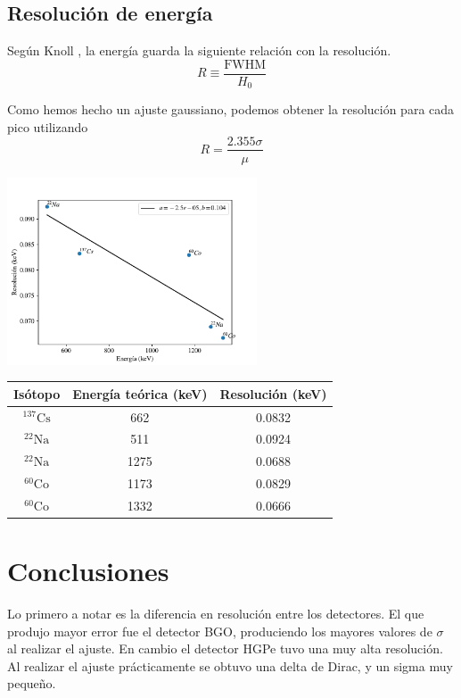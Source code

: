 \documentclass[a4paper, onecolumn]{article}
\begin{document}
		\subsection{Resolución de energía}

		Según Knoll \cite{knoll_radiation_2010}, la energía guarda la siguiente relación con la resolución.
		$$
		R \equiv \frac{\mathrm{FWHM}}{H_0}
		$$

		Como hemos hecho un ajuste gaussiano, podemos obtener la resolución para cada pico utilizando
		$$
		R = \frac{2.355\sigma}{\mu}
		$$

		\begin{center}
			\includegraphics[width=210pt]{img/resolution_vs_energy.pdf}
		\end{center}

		\begin{center}
			{\renewcommand{\arraystretch}{1.5}
			\renewcommand{\tabcolsep}{0.2cm}
			\label{table_energy_resolution}
			\begin{tabular}{ c c c  }
				\hline
				Isótopo & Energía teórica (keV) & Resolución (keV) \\
				\hline
				${}^{137}\mathrm{Cs}$ & 662 & 0.0832\\ 
				${}^{22}\mathrm{Na}$  & 511 & 0.0924\\ 
				${}^{22}\mathrm{Na}$  & 1275 & 0.0688 \\ 
				${}^{60}\mathrm{Co}$ & 1173 & 0.0829 \\ 
				${}^{60}\mathrm{Co}$  & 1332 & 0.0666
			\end{tabular}}
		\end{center}
	\section{Conclusiones}
		Lo primero a notar es la diferencia en resolución entre los detectores. El que produjo mayor error fue el detector BGO, produciendo los mayores valores de $\sigma$ al realizar el ajuste. En cambio el detector HGPe tuvo una muy alta resolución. Al realizar el ajuste prácticamente se obtuvo una delta de Dirac, y un sigma muy pequeño.
\end{document}
